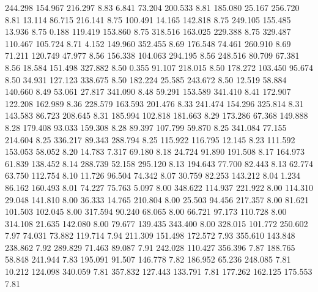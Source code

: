  244.298  154.967  216.297         8.83
   6.841   73.204  200.533         8.81
 185.080   25.167  256.720         8.81
  13.114   86.715  216.141         8.75
 100.491   14.165  142.818         8.75
 249.105  155.485   13.936         8.75
   0.188  119.419  153.860         8.75
 318.516  163.025  229.388         8.75
 329.487  110.467  105.724         8.71
   4.152  149.960  352.455         8.69
 176.548   74.461  260.910         8.69
  71.211  120.749   47.977         8.56
 156.338  104.063  294.195         8.56
 248.516   80.709   67.381         8.56
  18.584  151.498  327.882         8.50
   0.355   91.107  218.015         8.50
 178.272  103.450   95.674         8.50
  34.931  127.123  338.675         8.50
 182.224   25.585  243.672         8.50
  12.519   58.884  140.660         8.49
  53.061   27.817  341.090         8.48
  59.291  153.589  341.410         8.41
 172.907  122.208  162.989         8.36
 228.579  163.593  201.476         8.33
 241.474  154.296  325.814         8.31
 143.583   86.723  208.645         8.31
 185.994  102.818  181.663         8.29
 173.286   67.368  149.888         8.28
 179.408   93.033  159.308         8.28
  89.397  107.799   59.870         8.25
 341.084   77.155  214.604         8.25
 336.217   89.343  288.794         8.25
 115.922  116.795   12.145         8.23
 111.592  153.053   58.052         8.20
  14.783    7.317   69.180         8.18
  24.724   91.890  191.508         8.17
 164.973   61.839  138.452         8.14
 288.739   52.158  295.120         8.13
 194.643   77.700   82.443         8.13
  62.774   63.750  112.754         8.10
  11.726   96.504   74.342         8.07
  30.759   82.253  143.212         8.04
   1.234   86.162  160.493         8.01
  74.227   75.763    5.097         8.00
 348.622  114.937  221.922         8.00
 114.310   29.048  141.810         8.00
  36.333   14.765  210.804         8.00
  25.503   94.456  217.357         8.00
  81.621  101.503  102.045         8.00
 317.594   90.240   68.065         8.00
  66.721   97.173  110.728         8.00
 314.108   21.635  142.080         8.00
  79.677  139.435  343.400         8.00
 328.015  101.772  250.602         7.97
  74.031   73.882  119.714         7.94
 211.309  151.498  172.572         7.93
 355.610  143.848  238.862         7.92
 289.829   71.463   89.087         7.91
 242.028  110.427  356.396         7.87
 188.765   58.848  241.944         7.83
 195.091   91.507  146.778         7.82
 186.952   65.236  248.085         7.81
  10.212  124.098  340.059         7.81
 357.832  127.443  133.791         7.81
 177.262  162.125  175.553         7.81
